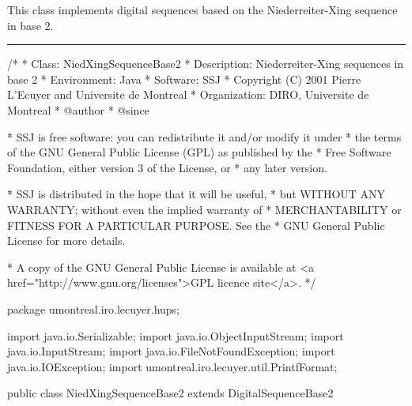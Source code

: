 
This class implements digital sequences based on the
 Niederreiter-Xing sequence in base 2.


\bigskip\hrule
\begin{code}
\begin{hide}
/*
 * Class:        NiedXingSequenceBase2
 * Description:  Niederreiter-Xing sequences in base 2
 * Environment:  Java
 * Software:     SSJ 
 * Copyright (C) 2001  Pierre L'Ecuyer and Universite de Montreal
 * Organization: DIRO, Universite de Montreal
 * @author       
 * @since

 * SSJ is free software: you can redistribute it and/or modify it under
 * the terms of the GNU General Public License (GPL) as published by the
 * Free Software Foundation, either version 3 of the License, or
 * any later version.

 * SSJ is distributed in the hope that it will be useful,
 * but WITHOUT ANY WARRANTY; without even the implied warranty of
 * MERCHANTABILITY or FITNESS FOR A PARTICULAR PURPOSE.  See the
 * GNU General Public License for more details.

 * A copy of the GNU General Public License is available at
   <a href="http://www.gnu.org/licenses">GPL licence site</a>.
 */
\end{hide}
package umontreal.iro.lecuyer.hups; \begin{hide} 

import java.io.Serializable;
import java.io.ObjectInputStream;
import java.io.InputStream;
import java.io.FileNotFoundException;
import java.io.IOException;
import umontreal.iro.lecuyer.util.PrintfFormat;
\end{hide}

public class NiedXingSequenceBase2 extends DigitalSequenceBase2 \begin{hide} { 

   private static final int MAXDIM  = 32;  // Maximum dimension.
   private static final int NUMCOLS = 30;  // Maximum number of columns.
   private static final boolean isTrans = true;
\end{hide} 
\end{code}
